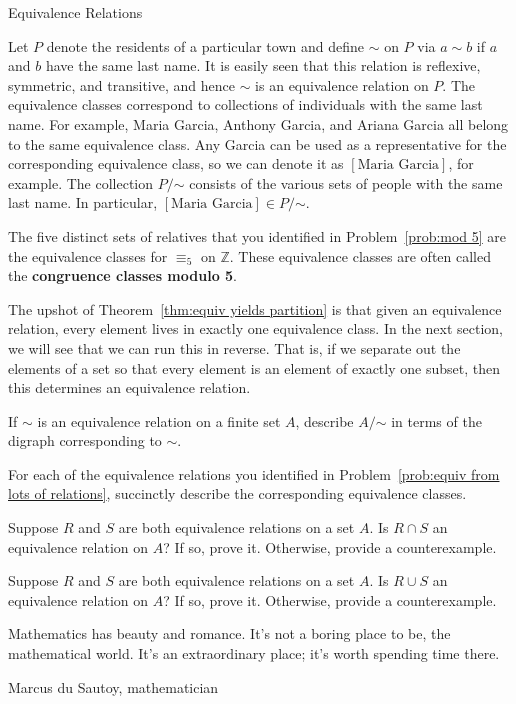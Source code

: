 \begin{section}{Equivalence Relations}
\begin{example}\label{ex:last name}
Let $P$ denote the residents of a particular town and define $\sim$ on $P$ via $a\sim b$ if $a$ and $b$ have the same last name. It is easily seen that this relation is reflexive, symmetric, and transitive, and hence $\sim$ is an equivalence relation on $P$.  The equivalence classes correspond to collections of individuals with the same last name.  For example, Maria Garcia, Anthony Garcia, and Ariana Garcia all belong to the same equivalence class.  Any Garcia can be used as a representative for the corresponding equivalence class, so we can denote it as $[\text{Maria Garcia}]$, for example. The collection $P/\mathord\sim$ consists of the various sets of people with the same last name.  In particular, $[\text{Maria Garcia}]\in P/\mathord\sim$.
\end{example}

\begin{example}
The five distinct sets of relatives that you identified in Problem~\ref{prob:mod 5} are the equivalence classes for $\equiv_5$ on $\mathbb{Z}$. These equivalence classes are often called the \textbf{congruence classes modulo 5}.
\end{example}

The upshot of Theorem~\ref{thm:equiv yields partition} is that given an equivalence relation, every element lives in exactly one equivalence class.  In the next section, we will see that we can run this in reverse.  That is, if we separate out the elements of a set so that every element is an element of exactly one subset, then this determines an equivalence relation.

\begin{problem}
If $\sim$ is an equivalence relation on a finite set $A$, describe $A/\mathord\sim$ in terms of the digraph corresponding to $\sim$.
\end{problem}

\begin{problem}
For each of the equivalence relations you identified in Problem~\ref{prob:equiv from lots of relations}, succinctly describe the corresponding equivalence classes.
\end{problem}

\begin{problem}
Suppose $R$ and $S$ are both equivalence relations on a set $A$. Is $R\cap S$ an equivalence relation on $A$? If so, prove it.  Otherwise, provide a counterexample.
\end{problem}

\begin{problem}
Suppose $R$ and $S$ are both equivalence relations on a set $A$. Is $R\cup S$ an equivalence relation on $A$? If so, prove it.  Otherwise, provide a counterexample.
\end{problem}

\epigraph{Mathematics has beauty and romance. It's not a boring place to be, the mathematical world. It's an extraordinary place; it's worth spending time there.}{Marcus du Sautoy, mathematician}

\end{section}